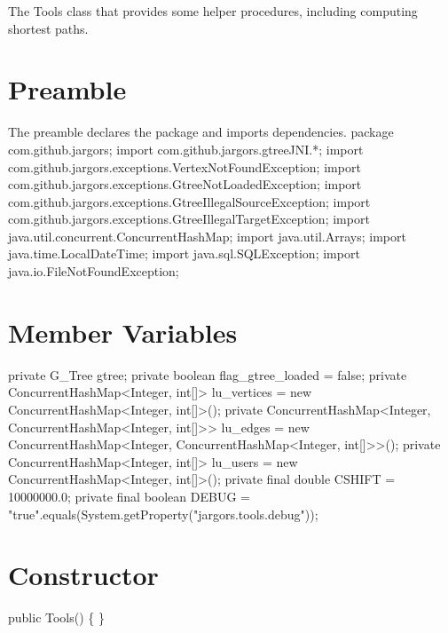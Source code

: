 The Tools class that provides some helper procedures, including computing
shortest paths.

\section{Preamble}
The preamble declares the package and imports dependencies.
\nwenddocs{}\endmoddef{}
package com.github.jargors;
import com.github.jargors.gtreeJNI.*;
import com.github.jargors.exceptions.VertexNotFoundException;
import com.github.jargors.exceptions.GtreeNotLoadedException;
import com.github.jargors.exceptions.GtreeIllegalSourceException;
import com.github.jargors.exceptions.GtreeIllegalTargetException;
import java.util.concurrent.ConcurrentHashMap;
import java.util.Arrays;
import java.time.LocalDateTime;
import java.sql.SQLException;
import java.io.FileNotFoundException;
\nwendcode{}\nwdocspar

\section{Member Variables}
\nwenddocs{}\endmoddef{}
private G_Tree gtree;
private boolean flag_gtree_loaded = false;
private ConcurrentHashMap<Integer, int[]> lu_vertices = new ConcurrentHashMap<Integer, int[]>();
private ConcurrentHashMap<Integer,
    ConcurrentHashMap<Integer, int[]>>    lu_edges    = new ConcurrentHashMap<Integer, ConcurrentHashMap<Integer, int[]>>();
private ConcurrentHashMap<Integer, int[]> lu_users    = new ConcurrentHashMap<Integer, int[]>();
private final double CSHIFT = 10000000.0;
private final boolean DEBUG = "true".equals(System.getProperty("jargors.tools.debug"));
\nwendcode{}\nwdocspar

\section{Constructor}
\nwenddocs{}\endmoddef{}
public Tools() \{ \}
\nwendcode{}\nwdocspar

